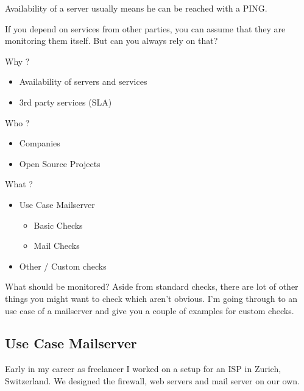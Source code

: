 Availability of a server usually means he can be reached with a PING.

If you depend on services from other parties, you can assume that
they are monitoring them itself. But can you always rely on that?

\begin{frame}[fragile]{Why ?}
\begin{itemize}
\item Availability of servers and services
\item 3rd party services (SLA)
\end{itemize}
\end{frame}

\begin{frame}[fragile]{Who ?}
\begin{itemize}
\item Companies
\item Open Source Projects
\end{itemize}
\end{frame}

\begin{frame}[fragile]{What ?}
\begin{itemize}
\item Use Case Mailserver
\begin{itemize}
\item Basic Checks
\item Mail Checks
\end{itemize}
\item Other / Custom checks
\end{itemize}
\end{frame}


What should be monitored? Aside from standard checks, there are 
lot of other things you might want to check which aren't obvious.
I'm going through to an use case of a mailserver and give you
a couple of examples for custom checks.

\subsection{Use Case Mailserver}
Early in my career as freelancer I worked on a setup for an ISP
in Zurich, Switzerland. We designed the firewall, web servers
and mail server on our own. 

